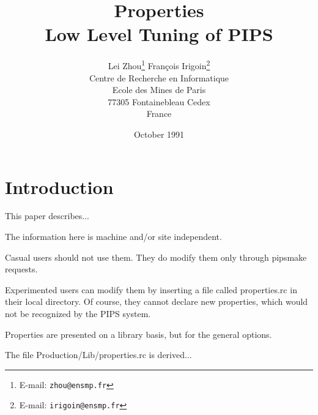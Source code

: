 %
%
% 

\batchmode
{}
\title{Properties \\
	Low Level Tuning of PIPS}
\author{Lei Zhou\thanks{E-mail: {\tt zhou@ensmp.fr}} \hspace{2cm} 
        Fran\c{c}ois Irigoin\thanks{E-mail: {\tt irigoin@ensmp.fr}} \vspace{1cm}\\
        Centre de Recherche en Informatique \\
        Ecole des Mines de Paris \\
        77305 Fontainebleau Cedex \\
        France \\}
\date{October 1991}

\addtolength{\textwidth}{72pt}
\addtolength{\oddsidemargin}{-48pt}
\addtolength{\evensidemargin}{-48pt}
\addtolength{\textheight}{172pt}
\addtolength{\topmargin}{-60pt}


\thispagestyle{empty}

\maketitle


\section*{Introduction}

This paper describes...

The information here is machine and/or site independent.

Casual users should not use them. They do modify them only through pipsmake
requests.

Experimented users can modify them by inserting a file called properties.rc
in their local directory. Of course, they cannot declare new properties,
which would not be recognized by the PIPS system.

Properties are presented on a library basis, but for the general options.

The file Production/Lib/properties.rc is derived...

